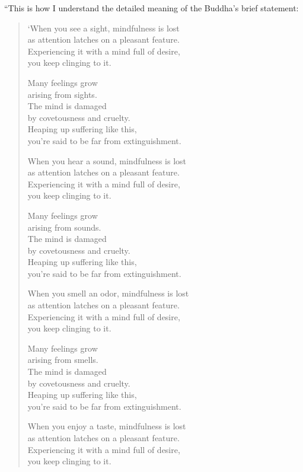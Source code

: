 \documentclass[12pt,openany]{book}%
\begin{document}
“This is how I understand the detailed meaning of the Buddha’s brief statement: 

\begin{verse}%
‘When you see a sight, mindfulness is lost \\
as attention latches on a pleasant feature. \\
Experiencing it with a mind full of desire, \\
you keep clinging to it. 

Many feelings grow \\
arising from sights. \\
The mind is damaged \\
by covetousness and cruelty. \\
Heaping up suffering like this, \\
you’re said to be far from extinguishment. 

When you hear a sound, mindfulness is lost \\
as attention latches on a pleasant feature. \\
Experiencing it with a mind full of desire, \\
you keep clinging to it. 

Many feelings grow \\
arising from sounds. \\
The mind is damaged \\
by covetousness and cruelty. \\
Heaping up suffering like this, \\
you’re said to be far from extinguishment. 

When you smell an odor, mindfulness is lost \\
as attention latches on a pleasant feature. \\
Experiencing it with a mind full of desire, \\
you keep clinging to it. 

Many feelings grow \\
arising from smells. \\
The mind is damaged \\
by covetousness and cruelty. \\
Heaping up suffering like this, \\
you’re said to be far from extinguishment. 

When you enjoy a taste, mindfulness is lost \\
as attention latches on a pleasant feature. \\
Experiencing it with a mind full of desire, \\
you keep clinging to it. 


\end{verse}
\end{document}
